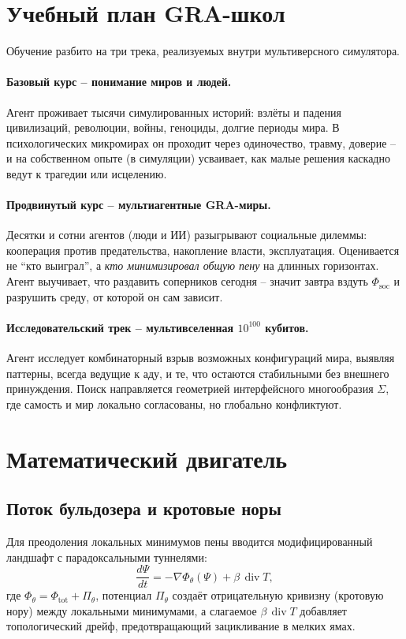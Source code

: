 \documentclass[a4paper,12pt]{article}
\begin{document}
\section{Учебный план GRA-школ}

Обучение разбито на три трека, реализуемых внутри мультиверсного симулятора.

\paragraph{Базовый курс -- понимание миров и людей.}
Агент проживает тысячи симулированных историй: взлёты и падения цивилизаций, революции, войны, геноциды, долгие периоды мира. В психологических микромирах он проходит через одиночество, травму, доверие -- и на собственном опыте (в симуляции) усваивает, как малые решения каскадно ведут к трагедии или исцелению.

\paragraph{Продвинутый курс -- мультиагентные GRA-миры.}
Десятки и сотни агентов (люди и ИИ) разыгрывают социальные дилеммы: кооперация против предательства, накопление власти, эксплуатация. Оценивается не ``кто выиграл'', а \emph{кто минимизировал общую пену} на длинных горизонтах. Агент выучивает, что раздавить соперников сегодня -- значит завтра вздуть $\Phi_{\text{soc}}$ и разрушить среду, от которой он сам зависит.

\paragraph{Исследовательский трек -- мультивселенная $10^{100}$ кубитов.}
Агент исследует комбинаторный взрыв возможных конфигураций мира, выявляя паттерны, всегда ведущие к аду, и те, что остаются стабильными без внешнего принуждения. Поиск направляется геометрией интерфейсного многообразия $\Sigma$, где самость и мир локально согласованы, но глобально конфликтуют.

\section{Математический двигатель}
\subsection{Поток бульдозера и кротовые норы}
Для преодоления локальных минимумов пены вводится модифицированный ландшафт с парадоксальными туннелями:
\begin{equation}\label{eq:bulldozer}
\frac{d\Psi}{dt} = -\nabla \Phi_\theta(\Psi) + \beta\,\operatorname{div} T,
\end{equation}
где $\Phi_\theta = \Phi_{\text{tot}} + \Pi_\theta$, потенциал $\Pi_\theta$ создаёт отрицательную кривизну (кротовую нору) между локальными минимумами, а слагаемое $\beta\,\operatorname{div} T$ добавляет топологический дрейф, предотвращающий зацикливание в мелких ямах.
\end{document}
